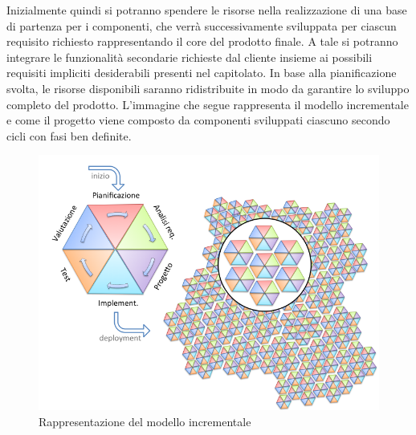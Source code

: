 	Inizialmente quindi si potranno spendere le risorse nella realizzazione di una base di partenza per i componenti, che verrà successivamente sviluppata per ciascun requisito richiesto rappresentando il core del prodotto finale.
	A tale  si potranno integrare le funzionalità secondarie richieste dal cliente insieme ai possibili requisiti impliciti desiderabili presenti nel capitolato. In base alla pianificazione svolta, le risorse disponibili saranno ridistribuite in modo da garantire lo sviluppo completo del prodotto.
	L'immagine che segue rappresenta il modello incrementale e come il progetto viene composto da componenti sviluppati ciascuno secondo cicli con fasi ben definite.
	\begin{figure}[H]
		\centering
		\includegraphics[scale=0.5]{img/modello_incrementale.png}
		\caption{Rappresentazione del modello incrementale \protect\footnotemark}
	\end{figure}

	